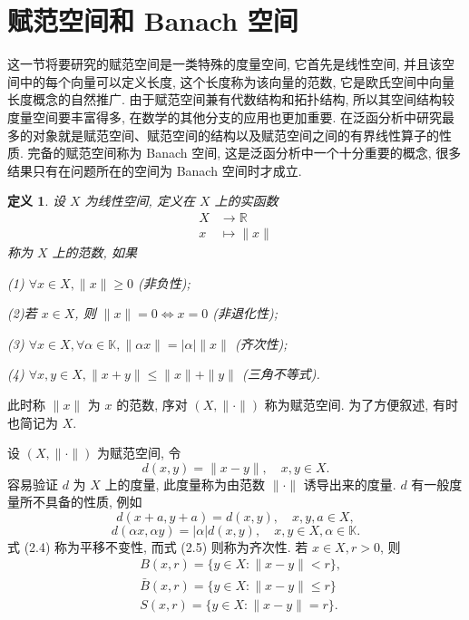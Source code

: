 \documentclass[openany]{ctexbook}
\theoremstyle{kaiti}
\newtheorem{definition}{定义}[section]
\theoremstyle{normal}
\begin{document}
\section{赋范空间和 Banach 空间}

这一节将要研究的赋范空间是一类特殊的度量空间, 它首先是线性空间, 并且该空间中的每个向量可以定义长度, 这个长度称为该向量的范数, 它是欧氏空间中向量长度概念的自然推广. 由于赋范空间兼有代数结构和拓扑结构, 所以其空间结构较度量空间要丰富得多, 在数学的其他分支的应用也更加重要. 在泛函分析中研究最多的对象就是赋范空间、赋范空间的结构以及赋范空间之间的有界线性算子的性质. 完备的赋范空间称为 Banach 空间, 这是泛函分析中一个十分重要的概念, 很多结果只有在问题所在的空间为 Banach 空间时才成立.

\begin{definition}
设 $X$ 为线性空间, 定义在 $X$ 上的实函数
$$
\begin{aligned}
X & \rightarrow \mathbb{R} \\
x & \mapsto\|x\|
\end{aligned}
$$
称为 $X$ 上的范数, 如果

(1) $\forall x \in X,\|x\| \geqslant 0$ (非负性);

(2)若 $x \in X$, 则 $\|x\|=0 \Leftrightarrow x=0$ (非退化性);

(3) $\forall x \in X, \forall \alpha \in \mathbb{K},\|\alpha x\|=|\alpha|\|x\|$ (齐次性);

(4) $\forall x, y \in X,\|x+y\| \leqslant\|x\|+\|y\|$ (三角不等式).
\end{definition}

此时称 $\|x\|$ 为 $x$ 的范数, 序对 $(X,\|\cdot\|)$ 称为赋范空间. 为了方便叙述, 有时也简记为 $X$.

设 $(X,\|\cdot\|)$ 为赋范空间, 令
\begin{equation}
  d(x, y)=\|x-y\|, \quad x, y \in X.
\end{equation}
容易验证 $d$ 为 $X$ 上的度量, 此度量称为由范数 $\|\cdot\|$ 诱导出来的度量. $d$ 有一般度量所不具备的性质, 例如
\begin{equation}
  d(x+a, y+a)=d(x, y), \quad x, y, a \in X,
\end{equation}
\begin{equation}
  d(\alpha x, \alpha y)=|\alpha| d(x, y), \quad x, y \in X, \alpha \in \mathbb{K}.
\end{equation}
式 (2.4) 称为平移不变性, 而式 (2.5) 则称为齐次性. 若 $x \in X, r>0$, 则
$$
\begin{aligned}
&B(x, r)=\{y \in X:\|x-y\|<r\}, \\
&\bar{B}(x, r)=\{y \in X:\|x-y\| \leqslant r\} \\
&S(x, r)=\{y \in X:\|x-y\|=r\}.
\end{aligned}
$$
\end{document}
